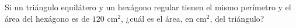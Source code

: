 Si un triángulo equilátero y un hexágono regular tienen el mismo perímetro y el área del hexágono es de $120$ cm$^2$, ¿cuál es el área, en cm$^2$, del triángulo?